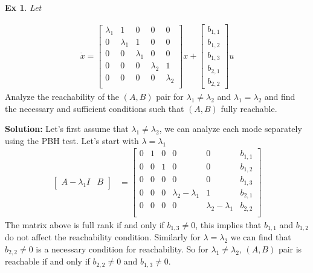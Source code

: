 \documentclass[twoside]{article}
\newtheorem{exmp}[theorem]{Ex}
\begin{document}
\begin{exmp}
Let 
\end{exmp}
%
%
\begin{align*}
    \dot{x} = \left[
 \begin{array}{ccc|cc} \lambda_1 & 1 & 0 & 0 & 0 \\
     0 & \lambda_1 & 1 & 0 & 0 
    \\
    0 & 0 & \lambda_1 &  0 & 0 \\
    \hline
    0 & 0 & 0 & \lambda_2 & 1 \\
    0 & 0 & 0 & 0 & \lambda_2 \\
    \end{array} \right]
    x + \left[ \begin{array}{c} b_{1,1} \\ b_{1,2} 
    \\ b_{1,3} \\ b_{2,1} \\ b_{2,2}  
  \end{array} \right] u
\end{align*}
% 
Analyze the reachability of the $(A,B)$ pair for $\lambda_1 \neq \lambda_2$ and $\lambda_1 = \lambda_2$
and find the necessary and sufficient conditions such that 
$(A,B)$ fully reachable.

\textbf{Solution:} Let's first assume that $\lambda_1 \neq \lambda_2$, we can analyze each mode separately using the PBH test. Let's start with $\lambda = \lambda_1$
%
\begin{align*}
  \left[ \begin{array}{c|c} A - \lambda_1 I & B \end{array} \right]
  &= \left[  \begin{array}{ccc|cc|c} 0 & 1 & 0 & 0 & 0 & b_{1,1} \\
     0 & 0 & 1 & 0 & 0 & b_{1,2}
    \\
    0 & 0 & 0 &  0 & 0 & b_{1,3 }\\
    \hline
    0 & 0 & 0 & \lambda_2 - \lambda_1 & 1 & b_{2,1} \\
    0 & 0 & 0 & 0 & \lambda_2 - \lambda_1 & b_{2,2}   \\
    \end{array} \right]
\end{align*}
%
The matrix above is full rank if and only if $b_{1,3} \neq 0$,
this implies that $b_{1,1}$ and $b_{1,2}$ do not affect
the reachability condition. Similarly for $\lambda = \lambda_2$
we can find that $b_{2,2} \neq 0$ is a necessary condition for 
reachability. So for $\lambda_1 \neq \lambda_2$, $(A,B)$ pair
is reachable if and only if $b_{2,2} \neq 0$ and $b_{1,3} \neq 0$.
\end{document}
